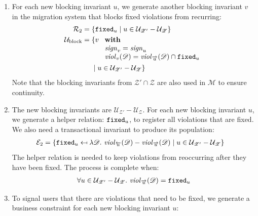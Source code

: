 \documentclass[runningheads]{llncs}
\newcommand{\id}[1]{\text{\it #1\/}}
\newcommand{\viol}[2]{\violC{#1}(#2)}
\newcommand{\violC}[1]{\id{viol}_{#1}}
\newcommand{\sign}[1]{\id{sign}_{#1}}
\newcommand{\rels}{\mathcal{R}}   %
\newcommand{\rules}{\mathcal{U}}
\newcommand{\transactions}{\mathcal{E}}
\newcommand{\dataset}{\mathscr{D}}
\newcommand{\schema}{\mathscr{Z}}
\newcommand{\migrsys}{\mathscr{M}}
\begin{document}
\begin{enumerate}
\item\label{step3} For each new blocking invariant $u$, we generate another blocking invariant $v$ in the migration system that blocks fixed violations from recurring:
   \begin{align}
      \rels_2={}&\{{\tt fixed}_u\mid u \in \rules_{\schema'}-\rules_{\schema}\}\\
      \rules_\text{block}={}&\{v\ 
      \begin{array}[t]{l}
         \text{\bf with}\\
         \sign{v}=\sign{u}\\
         \viol{v}{\dataset}=\viol{\overrightarrow{u}}{\dataset}\cap{\tt fixed}_u
      \end{array}\\
      &\mid u\in\rules_{\schema'}-\rules_{\schema}\}\notag
   \end{align}
   Note that the blocking invariants from $\schema'\cap\schema$ are also used in $\migrsys$ to ensure continuity.
\item\label{step4} The new blocking invariants are $\rules_{\schema'}-\rules_{\schema}$.
   For each new blocking invariant $u$, we generate a helper relation: ${\tt fixed}_u$, to register all violations that are fixed.
   We also need a transactional invariant to produce its population:
   \begin{align}
      \transactions_2={}&\{{\tt fixed}_u\mapsfrom\lambda\dataset.~\viol{\overleftarrow{u}}{\dataset}-\viol{\overrightarrow{u}}{\dataset}\mid u\in\rules_{\schema'}-\rules_{\schema}\}\label{eqn:enforceForRules}
   \end{align}
   The helper relation is needed to keep violations from reoccurring after they have been fixed.
   The process is complete when:
   \begin{align}
      \forall u\in\rules_{\schema'}-\rules_{\schema}.~\viol{\overrightarrow{u}}{\dataset}={\tt fixed}_u\label{eqn:fixingTerminates}
   \end{align}
\item\label{step5} To signal users that there are violations that need to be fixed, we generate a business constraint for each new blocking invariant $u$:

\end{enumerate}
\end{document}
